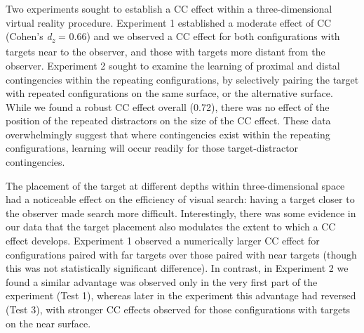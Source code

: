 \documentclass[
  english,
  man,floatsintext]{apa7}
\begin{document}
Two experiments sought to establish a CC effect within a three-dimensional virtual reality procedure. Experiment 1 established a moderate effect of CC (Cohen's \emph{d\textsubscript{z}} = 0.66) and we observed a CC effect for both configurations with targets near to the observer, and those with targets more distant from the observer. Experiment 2 sought to examine the learning of proximal and distal contingencies within the repeating configurations, by selectively pairing the target with repeated configurations on the same surface, or the alternative surface. While we found a robust CC effect overall (0.72), there was no effect of the position of the repeated distractors on the size of the CC effect. These data overwhelmingly suggest that where contingencies exist within the repeating configurations, learning will occur readily for those target-distractor contingencies.

The placement of the target at different depths within three-dimensional space had a noticeable effect on the efficiency of visual search: having a target closer to the observer made search more difficult. Interestingly, there was some evidence in our data that the target placement also modulates the extent to which a CC effect develops. Experiment 1 observed a numerically larger CC effect for configurations paired with far targets over those paired with near targets (though this was not statistically significant difference). In contrast, in Experiment 2 we found a similar advantage was observed only in the very first part of the experiment (Test 1), whereas later in the experiment this advantage had reversed (Test 3), with stronger CC effects observed for those configurations with targets on the near surface.
\end{document}

